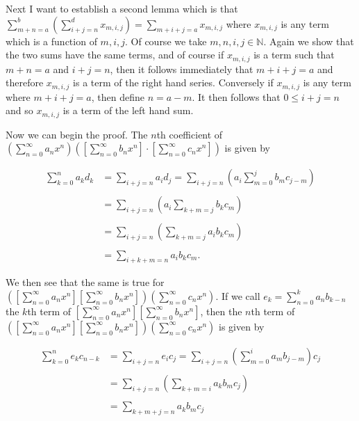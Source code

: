\documentclass{article}
\begin{document}
  Next I want to establish a second lemma which is that $\displaystyle\sum_{m+n=a}^b \left( \sum_{i+j=n}^d x_{m,i,j}\right) = \sum_{m+i+j=a}x_{m,i,j}$ where $x_{m,i,j}$ is any term which is a function of $m,i,j$.  Of course we take $m,n,i,j\in\mathbb N$.  Again we show that the two sums have the same terms, and of course if $x_{m,i,j}$ is a term such that $m+n=a$ and $i+j=n$, then it follows immediately that $m+i+j=a$ and therefore $x_{m,i,j}$ is a term of the right hand series.  Conversely if $x_{m,i,j}$ is any term where $m+i+j=a$, then define $n=a-m$.  It then follows that $0\leq i+j=n$ and so $x_{m,i,j}$ is a term of the left hand sum.

  Now we can begin the proof.  The $n$th coefficient of \linebreak $\displaystyle \left(\sum_{n=0}^\infty a_nx^n\right)\left(\left[\sum_{n=0}^\infty b_nx^n\right]\cdot \left[\sum_{n=0}^\infty c_nx^n\right]\right)$ is given by

  \begin{align*}
    \sum_{k=0}^n a_kd_k &= \sum_{i+j=n}a_id_j = \sum_{i+j=n}\left(a_i\sum_{m=0}^jb_mc_{j-m}\right) \\\\
    &= \sum_{i+j=n}\left(a_i\sum_{k+m=j}b_kc_m\right) \\\\
    &= \sum_{i+j=n}\left(\sum_{k+m=j}a_ib_kc_m\right) \\\\
    &= \sum_{i+k+m=n} a_ib_kc_m.
  \end{align*}

  We then see that the same is true for $\displaystyle \left(\left[\sum_{n=0}^\infty a_nx^n\right]\left[\sum_{n=0}^\infty b_nx^n\right]\right) \left(\sum_{n=0}^\infty c_nx^n\right)$.  If we call $e_k = \displaystyle\sum_{n=0}^k a_nb_{k-n}$ the $k$th term of $\displaystyle\left[\sum_{n=0}^\infty a_nx^n\right]\left[\sum_{n=0}^\infty b_nx^n\right]$, then the $n$th term of $\displaystyle \left(\left[\sum_{n=0}^\infty a_nx^n\right]\left[\sum_{n=0}^\infty b_nx^n\right]\right) \left(\sum_{n=0}^\infty c_nx^n\right)$ is given by

  \begin{align*}
    \sum_{k=0}^n e_kc_{n-k} &= \sum_{i+j=n}e_ic_j= \sum_{i+j=n}\left(\sum_{m=0}^ia_mb_{j-m}\right)c_j \\\\
    &= \sum_{i+j=n}\left(\sum_{k+m=i} a_kb_mc_j\right) \\\\
    &= \sum_{k+m+j=n} a_kb_mc_j
  \end{align*}
\end{document}
